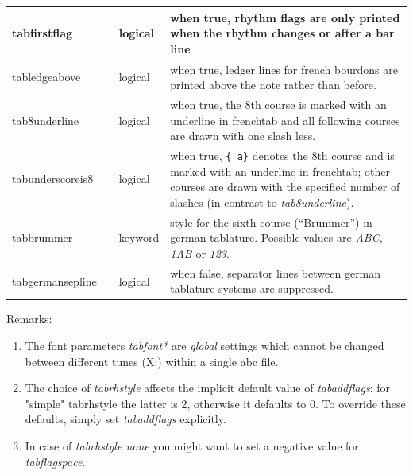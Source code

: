 \documentclass[a4paper]{article}
\begin{document}
\begin{center}
\begin{longtable}{|l|l|l|p{7.2cm}|}
tabfirstflag & & logical & when true, rhythm flags are only printed when the
    rhythm changes or after a bar line \\ \hline
tabledgeabove & & logical & when true, ledger lines for french bourdons
    are printed above the note rather than before. \\ \hline
tab8underline & & logical & when true, the 8th course is marked with an
    underline in frenchtab and all following courses are drawn with one
    slash less. \\ \hline
tabunderscoreis8 & & logical & when true, \verb|{_a}| denotes the 8th course
    and is marked with an underline in frenchtab; other courses are drawn with
    the specified number of slashes (in contrast to {\em tab8underline}).
    \\ \hline
tabbrummer & & keyword & style for the sixth course (``Brummer'') in
    german tablature. Possible values are {\it ABC}, {\it 1AB} or {\it 123}.
    \\ \hline
tabgermansepline & & logical & when false, separator lines between german
    tablature systems are suppressed. \\ \hline
\end{longtable}
\end{center}

Remarks:
\begin{enumerate}
\item The font parameters {\it tabfont*} are {\it global} settings
    which cannot be changed between different tunes (X:) within
    a single abc file.
\item The choice of {\it tabrhstyle} affects the implicit default value of
    {\it tabaddflags}: for "simple" tabrhstyle the latter is 2, otherwise
    it defaults to 0. To override these defaults, simply set {\it tabaddflags}
    explicitly.
\item In case of {\it tabrhstyle none} you might want to set a negative
    value for {\it tabflagspace}.
\end{enumerate}
\end{document}
